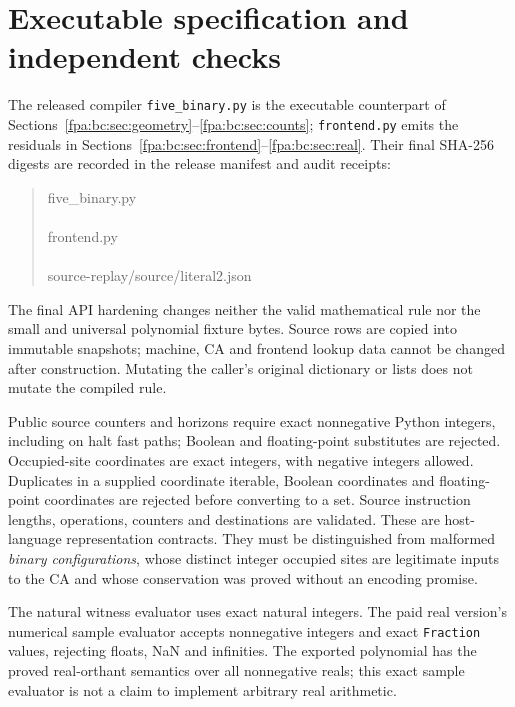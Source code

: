 \documentclass[11pt,a4paper]{article}
\numberwithin{equation}{section}
\begin{document}
\section{Executable specification and independent checks}\label{fpa:bc:sec:checks}
The released compiler \texttt{five\_binary.py} is the executable counterpart
of Sections~\ref{fpa:bc:sec:geometry}--\ref{fpa:bc:sec:counts}; \texttt{frontend.py} emits
the residuals in Sections~\ref{fpa:bc:sec:frontend}--\ref{fpa:bc:sec:real}. Their final
SHA-256 digests are recorded in the release manifest and audit receipts:
\begin{quote}\small\ttfamily
five\_binary.py\\
\\[4pt]
frontend.py\\
\\[4pt]
source-replay/source/literal2.json\\
\end{quote}
The final API hardening changes neither the valid mathematical rule nor the
small and universal polynomial fixture bytes. Source rows are copied into
immutable snapshots; machine, CA and frontend lookup data cannot be changed
after construction. Mutating the caller's original dictionary or lists does
not mutate the compiled rule.

Public source counters and horizons require exact nonnegative Python integers,
including on halt fast paths; Boolean and floating-point substitutes are
rejected. Occupied-site coordinates are exact integers, with negative integers
allowed. Duplicates in a supplied coordinate iterable, Boolean coordinates and
floating-point coordinates are rejected before converting to a set. Source
instruction lengths, operations, counters and destinations are validated.
These are host-language representation contracts. They must be distinguished
from malformed \emph{binary configurations}, whose distinct integer occupied
sites are legitimate inputs to the CA and whose conservation was proved
without an encoding promise.

The natural witness evaluator uses exact natural integers. The paid real
version's numerical sample evaluator accepts nonnegative integers and exact
\texttt{Fraction} values, rejecting floats, NaN and infinities. The exported
polynomial has the proved real-orthant semantics over all nonnegative reals;
this exact sample evaluator is not a claim to implement arbitrary real
arithmetic.
\end{document}
